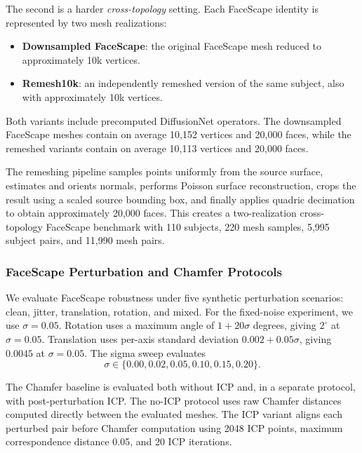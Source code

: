 The second is a harder \emph{cross-topology} setting. Each FaceScape identity is
represented by two mesh realizations:
\begin{itemize}
    \item \textbf{Downsampled FaceScape}: the original FaceScape mesh reduced to
    approximately 10k vertices.
    \item \textbf{Remesh10k}: an independently remeshed version of the same
    subject, also with approximately 10k vertices.
\end{itemize}
Both variants include precomputed DiffusionNet operators. The downsampled
FaceScape meshes contain on average 10,152 vertices and 20,000 faces, while the
remeshed variants contain on average 10,113 vertices and 20,000 faces.

The remeshing pipeline samples points uniformly from the source surface,
estimates and orients normals, performs Poisson surface reconstruction, crops the
result using a scaled source bounding box, and finally applies quadric decimation
to obtain approximately 20,000 faces. This creates a two-realization
cross-topology FaceScape benchmark with 110 subjects, 220 mesh samples, 5,995
subject pairs, and 11,990 mesh pairs.

\subsubsection{FaceScape Perturbation and Chamfer Protocols}
\label{app:faceverse_perturbation_protocol}

We evaluate FaceScape robustness under five synthetic perturbation scenarios:
clean, jitter, translation, rotation, and mixed. For the fixed-noise experiment,
we use $\sigma=0.05$. Rotation uses a maximum angle of $1+20\sigma$ degrees,
giving $2^\circ$ at $\sigma=0.05$. Translation uses per-axis standard deviation
$0.002+0.05\sigma$, giving $0.0045$ at $\sigma=0.05$. The sigma sweep evaluates
\begin{equation}
\sigma \in \{0.00, 0.02, 0.05, 0.10, 0.15, 0.20\}.
\label{eq:faceverse_sigma_sweep}
\end{equation}

The Chamfer baseline is evaluated both without ICP and, in a separate protocol,
with post-perturbation ICP. The no-ICP protocol uses raw Chamfer distances
computed directly between the evaluated meshes. The ICP variant aligns each
perturbed pair before Chamfer computation using 2048 ICP points, maximum
correspondence distance 0.05, and 20 ICP iterations.

